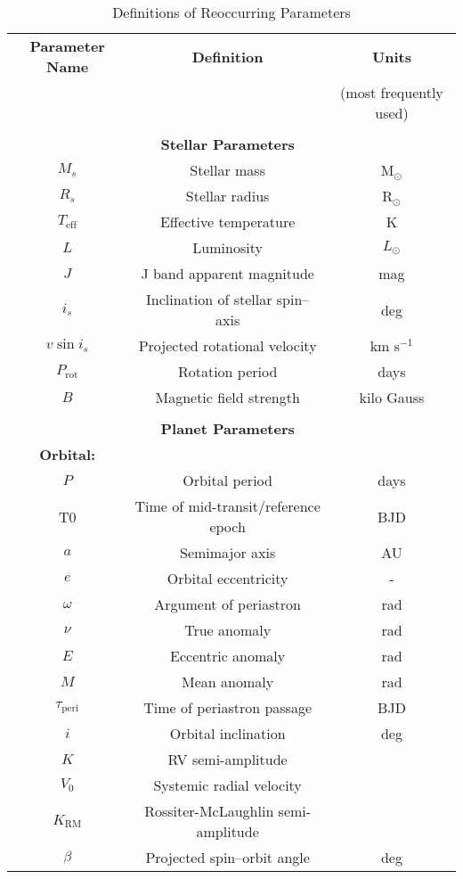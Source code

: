 \begin{table*}
\caption{Definitions of Reoccurring Parameters}
\label{table:paramdefs}
\begin{tabular}{ccc}
  \hline
  \hline
  \textbf{Parameter Name} & \textbf{Definition} & \textbf{Units} \\
  & & (most frequently used) \\
  \hline
  && \\
  & \textbf{Stellar Parameters} & \\
  \hline
  $M_s$ & Stellar mass & M$_{\odot}$ \\
  $R_s$ & Stellar radius & R$_{\odot}$ \\
  $T_{\mathrm{eff}}$ & Effective temperature & K \\
  $L$ & Luminosity & $L_{\odot}$ \\
  $J$ & J band apparent magnitude & mag \\
  $i_s$ & Inclination of stellar spin--axis & deg \\
  $v\sin{i_s}$ & Projected rotational velocity & km s$^{-1}$ \\
  $P_{\mathrm{rot}}$ & Rotation period & days \\
  $B$ & Magnetic field strength & kilo Gauss \\
  \hline
  && \\
  & \textbf{Planet Parameters} & \\
  \hline
  \textbf{Orbital:} & & \\
  $P$ & Orbital period & days \\
  T0 & Time of mid-transit/reference epoch & BJD \\
  $a$ & Semimajor axis & AU \\
  $e$ & Orbital eccentricity & - \\
  $\omega$ & Argument of periastron & rad \\
  $\nu$ & True anomaly & rad \\
  $E$ & Eccentric anomaly & rad \\
  $M$ & Mean anomaly & rad \\
  $\tau_{\mathrm{peri}}$ & Time of periastron passage & BJD \\
  $i$ & Orbital inclination & deg \\
  $K$ & RV semi-amplitude & \mps{} \\
  $V_0$ & Systemic radial velocity & \mps{} \\
  $K_{\mathrm{RM}}$ & Rossiter-McLaughlin semi-amplitude & \mps{} \\
  $\beta$ & Projected spin--orbit angle & deg \\

\end{tabular}
\end{table*}
